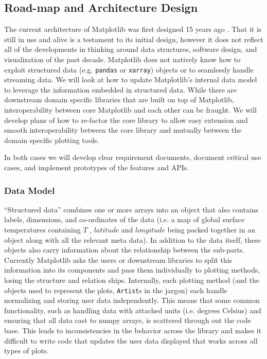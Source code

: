 \documentclass[11pt]{article}  %
\begin{document}
\subsection{Road-map and Architecture Design}

The current architecture of Matplotlib was first designed 15 years ago
\cite{Hunter:2007}.  That it is still in use and alive is a testament
to its initial design, however it does not reflect all of the
developments in thinking around data structures, software design, and
visualization of the past decade.  Matplotlib does not natively know
how to exploit structured data (e.g. \texttt{pandas} or
\texttt{xarray}) objects or to seamlessly handle streaming data.  We
will look at how to update Matplotlib's internal data model to
leverage the information embedded in structured data.  While there are
downstream domain specific libraries that are built on top of
Matplotlib, interoperability between core Matplotlib and each other
can be fraught.  We will develop plans of how to re-factor the core
library to allow easy extension and smooth interoperability between
the core library and mutually between the domain specific plotting
tools.

In both cases we will develop clear requirement documents, document
critical use cases, and implement prototypes of the features and APIs.


\subsubsection{Data Model}

``Structured data'' combines one or more arrays into an object that
also contains labels, dimensions, and co-ordinates of the data (i.e. a
map of global surface temperatures containing $T$ , $latitude$ and
$longitude$ being packed together in an object along with all the
relevant meta data).  In addition to the data itself, these objects
also carry information about the relationship between the sub-parts.
Currently Matplotlib asks the users or downstream libraries to split
this information into its components and pass them individually to
plotting methods, losing the structure and relation ships.
Internally, each plotting method (and the objects used to represent
the plots, \texttt{Artist}s in the jargon) each handle normalizing and
storing user data independently.  This means that some common
functionality, such as handling data with attached units (i.e. degrees
Celsius) and ensuring that all data cast to numpy arrays, is scattered
through out the code base.  This leads to inconsistencies in the
behavior across the library and makes it difficult to write code that
updates the user data displayed that works across all types of plots.
\end{document}
